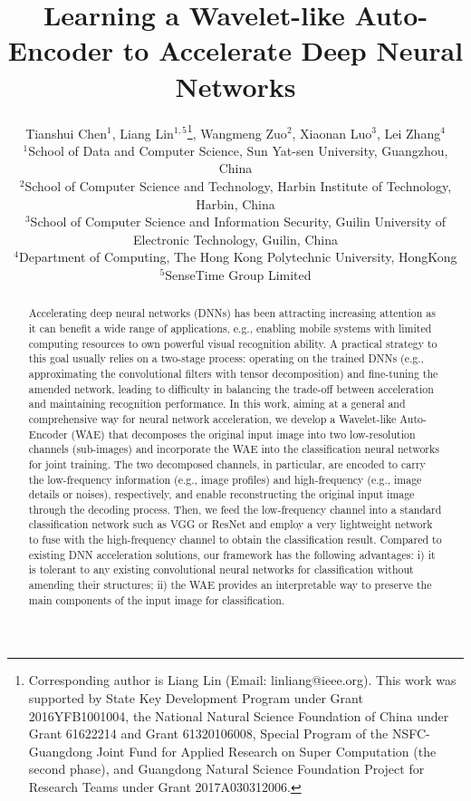 \documentclass[letterpaper]{article} %
\begin{document}
\title{Learning a Wavelet-like Auto-Encoder to Accelerate Deep Neural Networks}
\author{Tianshui Chen$^1$, Liang Lin$^{1,5}$\thanks{Corresponding author is Liang Lin (Email: linliang@ieee.org). This work was supported by State Key Development Program under Grant 2016YFB1001004, the National Natural
Science Foundation of China under Grant 61622214 and Grant 61320106008, Special Program of the NSFC-Guangdong Joint Fund for Applied Research on Super Computation (the second phase), and Guangdong Natural Science Foundation Project for Research Teams under Grant 2017A030312006.}, Wangmeng Zuo$^2$, Xiaonan Luo$^3$, Lei Zhang$^4$\\
$^1$School of Data and Computer Science, Sun Yat-sen University, Guangzhou, China\\
$^2$School of Computer Science and Technology, Harbin Institute of Technology, Harbin, China\\
$^3$School of Computer Science and Information Security, Guilin University of Electronic Technology, Guilin, China\\
$^4$Department of Computing, The Hong Kong Polytechnic University, HongKong\\
$^5$SenseTime Group Limited \\
}
\maketitle
\begin{abstract}
Accelerating deep neural networks (DNNs) has been attracting increasing attention as it can benefit a wide range of applications, e.g., enabling mobile systems with limited computing resources to own powerful visual recognition ability. A practical strategy to this goal usually relies on a two-stage process: operating on the trained DNNs (e.g., approximating the convolutional filters with tensor decomposition) and fine-tuning the amended network, leading to difficulty in balancing the trade-off between acceleration and maintaining recognition performance. In this work, aiming at a general and comprehensive way for neural network acceleration, we develop a Wavelet-like Auto-Encoder (WAE) that decomposes the original input image into two low-resolution channels (sub-images) and incorporate the WAE into the classification neural networks for joint training. The two decomposed channels, in particular, are encoded to carry the low-frequency information (e.g., image profiles) and high-frequency (e.g., image details or noises), respectively, and enable reconstructing the original input image through the decoding process. Then, we feed the low-frequency channel into a standard classification network such as VGG or ResNet and employ a very lightweight network to fuse with the high-frequency channel to obtain the classification result. Compared to existing DNN acceleration solutions, our framework has the following advantages: i) it is tolerant to any existing convolutional neural networks for classification without amending their structures; ii) the WAE provides an interpretable way to preserve the main components of the input image for classification.
\end{abstract}
\end{document}
